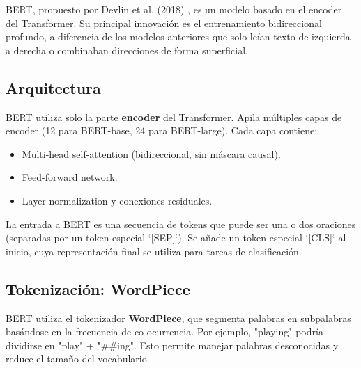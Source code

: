 \documentclass[12pt,a4paper,openany,oneside]{book}
\begin{document}
BERT, propuesto por Devlin et al. (2018) , es un modelo basado en el encoder del Transformer. Su principal innovación es el entrenamiento bidireccional profundo, a diferencia de los modelos anteriores que solo leían texto de izquierda a derecha o combinaban direcciones de forma superficial.

\subsection{Arquitectura}
BERT utiliza solo la parte \textbf{encoder} del Transformer. Apila múltiples capas de encoder (12 para BERT-base, 24 para BERT-large). Cada capa contiene:
\begin{itemize}
    \item Multi-head self-attention (bidireccional, sin máscara causal).
    \item Feed-forward network.
    \item Layer normalization y conexiones residuales.
\end{itemize}

La entrada a BERT es una secuencia de tokens que puede ser una o dos oraciones (separadas por un token especial `[SEP]`). Se añade un token especial `[CLS]` al inicio, cuya representación final se utiliza para tareas de clasificación.

\begin{center}
\caption{Arquitectura simplificada de BERT.}
\end{center}

\subsection{Tokenización: WordPiece}
BERT utiliza el tokenizador \textbf{WordPiece}, que segmenta palabras en subpalabras basándose en la frecuencia de co-ocurrencia. Por ejemplo, "playing" podría dividirse en "play" + "##ing". Esto permite manejar palabras desconocidas y reduce el tamaño del vocabulario.
\end{document}
